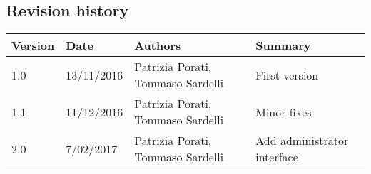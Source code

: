 \subsection{Revision history}
\begin{tabular}{|l|l|l|l|}
	\hline
	\textbf{Version}	& \textbf{Date}	& \textbf{Authors}	& \textbf{Summary}\\
	\hline
	1.0 	& 13/11/2016 	& Patrizia Porati, Tommaso Sardelli 	& First version\\
	\hline
	1.1 	& 11/12/2016 	& Patrizia Porati, Tommaso Sardelli 	& Minor fixes\\
	\hline
	2.0		& 7/02/2017 	& Patrizia Porati, Tommaso Sardelli 	& Add administrator interface\\
	\hline
\end{tabular}